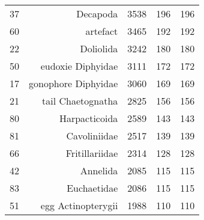 \begin{tabular}{|c|r|c|c|c|}
37  & Decapoda & 3538& 196& 196\\
60  & artefact & 3465& 192& 192\\
22  & Doliolida & 3242& 180& 180\\
50  & eudoxie  Diphyidae & 3111& 172& 172\\
17  & gonophore  Diphyidae & 3060& 169& 169\\
21  & tail  Chaetognatha & 2825& 156& 156\\
80  & Harpacticoida & 2589& 143& 143\\
81  & Cavoliniidae & 2517& 139& 139\\
66  & Fritillariidae & 2314& 128& 128\\
42  & Annelida & 2085& 115& 115\\
83  & Euchaetidae & 2086& 115& 115\\
51  & egg  Actinopterygii & 1988& 110& 110\\
\hline
\end{tabular}

